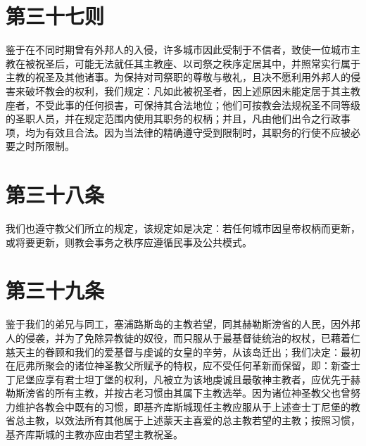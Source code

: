 
\section{第三十七则}

鉴于在不同时期曾有外邦人的入侵，许多城市因此受制于不信者，致使一位城市主教在被祝圣后，可能无法就任其主教座、以司祭之秩序定居其中，并照常实行属于主教的祝圣及其他诸事。为保持对司祭职的尊敬与敬礼，且决不愿利用外邦人的侵害来破坏教会的权利，我们规定：凡如此被祝圣者，因上述原因未能定居于其主教座者，不受此事的任何损害，可保持其合法地位；他们可按教会法规祝圣不同等级的圣职人员，并在规定范围内使用其职务的权柄；并且，凡由他们出令之行政事项，均为有效且合法。因为当法律的精确遵守受到限制时，其职务的行使不应被必要之时所限制。\par


\section{第三十八条}

我们也遵守教父们所立的规定，该规定如是决定：若任何城市因皇帝权柄而更新，或将要更新，则教会事务之秩序应遵循民事及公共模式。\par


\section{第三十九条}

鉴于我们的弟兄与同工，塞浦路斯岛的主教若望，同其赫勒斯滂省的人民，因外邦人的侵袭，并为了免除异教徒的奴役，而只服从于最基督徒统治的权杖，已藉着仁慈天主的眷顾和我们的爱基督与虔诚的女皇的辛劳，从该岛迁出；我们决定：最初在厄弗所聚会的诸位神圣教父所赋予的特权，应不受任何革新而保留，即：新查士丁尼堡应享有君士坦丁堡的权利，凡被立为该地虔诚且最敬神主教者，应优先于赫勒斯滂省的所有主教，并按古老习惯由其属下主教选举。因为诸位神圣教父也曾努力维护各教会中既有的习惯，即基齐库斯城现任主教应服从于上述查士丁尼堡的教省总主教，以效法所有其他属于上述蒙天主喜爱的总主教若望的主教；按照习惯，基齐库斯城的主教亦应由若望主教祝圣。\par


